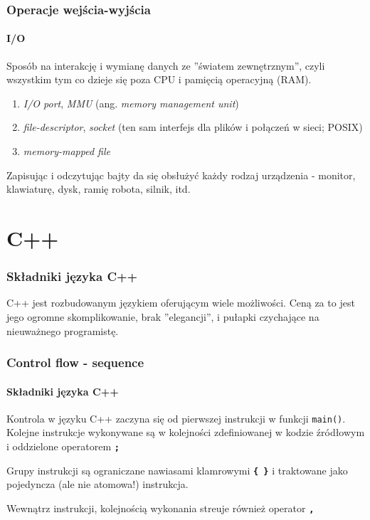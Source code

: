 \documentclass[aspectratio=169]{beamer}
\begin{document}
\begin{frame}
    \frametitle{Operacje wejścia-wyjścia}
    \framesubtitle{I/O}

    Sposób na interakcję i wymianę danych ze ''światem zewnętrznym'', czyli
    wszystkim tym co dzieje się poza CPU i pamięcią operacyjną (RAM).

    \begin{enumerate}
        \item \emph{I/O port}, \emph{MMU} (ang. \emph{memory management unit})
        \item \emph{file-descriptor}, \emph{socket} (ten sam interfejs dla
            plików i połączeń w sieci; POSIX)
        \item \emph{memory-mapped file}
    \end{enumerate}

    Zapisując i odczytując bajty da się obsłużyć każdy rodzaj urządzenia -
    monitor, klawiaturę, dysk, ramię robota, silnik, itd.
\end{frame}

\section{C++}

\begin{frame}
    \frametitle{Składniki języka C++}

    \begin{epigraphs}
    \end{epigraphs}

    C++ jest rozbudowanym językiem oferującym wiele możliwości. Ceną za to jest
    jego ogromne skomplikowanie, brak ''elegancji'', i pułapki czychające na
    nieuważnego programistę.
\end{frame}

\begin{frame}
    \frametitle{Control flow - sequence}
    \framesubtitle{Składniki języka C++}

    Kontrola w języku C++ zaczyna się od pierwszej instrukcji w funkcji
    {\tt main()}. Kolejne instrukcje wykonywane są w kolejności zdefiniowanej w
    kodzie źródłowym i oddzielone operatorem \textbf{{\tt ;}}

    \vspace{1em}

    Grupy instrukcji są ograniczane nawiasami klamrowymi \textbf{{\tt \{ \}}} i
    traktowane jako pojedyncza (ale nie atomowa!) instrukcja.

    \vspace{1em}

    Wewnątrz instrukcji, kolejnością wykonania streuje również operator
    \textbf{{\tt ,}}
\end{frame}
\end{document}
